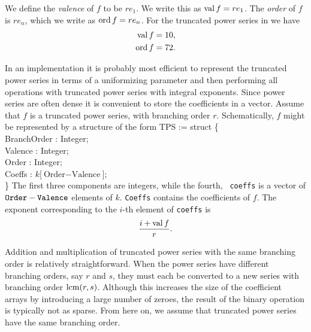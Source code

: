 We define the {\em valence} of $f$ to
be $r e_1$.  We write this as $\mathop{\rm val}\nolimits f = re_1$.  The {\em order} of $f$
is $r e_n$, which we write as $\mathop{\rm ord}\nolimits f = r e_n$.  For the truncated
power series in  we have
\[
\begin{aligned}
\mathop{\rm val}\nolimits f & = 10, \\
\mathop{\rm ord}\nolimits f & = 72.
\end{aligned}
\]

In an implementation it is probably most efficient to represent the
truncated power series in terms of a uniformizing parameter and
then performing all operations with truncated power series with
integral exponents.  Since power series are often dense it is
convenient to store the coefficients in a vector.  Assume that $f$ is
a truncated power series, with branching order $r$.  Schematically, 
$f$ might be represented by a structure of the form
\begindsacode
TPS := struct \{ \\
\> BranchOrder : Integer; \\
\> Valence : Integer; \\
\> Order : Integer; \\
\> Coeffs : $k$[$\mbox{Order} - \mbox{Valence}$]; \\
\>\}
\enddsacode
The first three components are integers, while the fourth, {\tt
coeffs} is a vector of $\mbox{\tt Order} - \mbox{\tt Valence}$
elements of $k$.  {\tt Coeffs} contains the coefficients of $f$.  The
exponent corresponding to the $i$-th element of {\tt coeffs} is
\[
\frac{i + \mathop{\rm val}\nolimits f}{r}.
\]

Addition and multiplication of truncated power series with the same
branching order is relatively straightforward.  When the power series
have different branching orders, say $r$ and $s$, they must each be
converted to a new series with branching order $\mathop{\rm lcm}\nolimits (r, s)$.
Although this increases the size of the coefficient arrays by
introducing a large number of zeroes, the result of the binary
operation is typically not as sparse.  From here on, we assume that
truncated power series have the same branching order.

